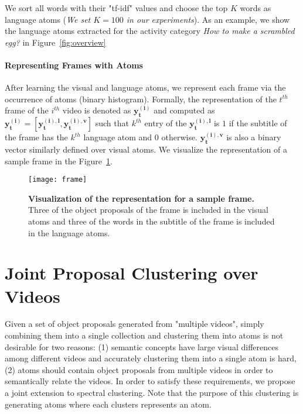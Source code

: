 We sort all words with their "tf-idf" values and choose the top $K$ words as language atoms (\emph{We set $K=100$ in our experiments}). As an example, we show the language atoms extracted for the activity category \emph{How to make a scrambled egg?} in Figure~\ref{fig:overview} %


\noindent\paragraph{Representing Frames with Atoms}
After learning the visual and language atoms, we represent each frame via the occurrence of atoms (binary histogram). Formally, the representation of the $t^{th}$ frame of the $i^{th}$ video is denoted as $\mathbf{y^{(i)}_t}$ and computed as $\mathbf{y^{(i)}_t}=[\mathbf{y^{(i),l}_t},\mathbf{y^{(i),v}_t}]$ such that $k^{th}$ entry of the $\mathbf{y^{(i),l}_t}$ is $1$ if the subtitle of the frame has the $k^{th}$ language atom and $0$ otherwise. $\mathbf{y^{(i),v}_t}$ is also a binary vector similarly defined over visual atoms. We visualize the representation of a sample frame in the Figure~\ref{visFrame}.
\begin{figure}[h!]
  \texttt{[image: frame]}
  \caption{\textbf{Visualization of the representation for a sample frame.} Three of the object proposals of the frame is included in the visual atoms and three of the words in the subtitle of the frame is included in the language atoms.}
  \label{visFrame}
\end{figure}

\section{Joint Proposal Clustering over Videos}
\label{jointProp}
Given a set of object proposals generated from "multiple videos", simply combining them into a single collection and clustering them into atoms is not desirable for two reasons: (1) semantic concepts have large visual differences among different videos and accurately clustering them into a single atom is hard, (2) atoms should contain object proposals from multiple videos in order to semantically relate the videos. In order to satisfy these requirements, we propose a joint extension to spectral clustering. Note that the purpose of this clustering is generating atoms where each clusters represents an atom.

